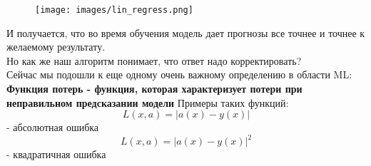 \documentclass[a4paper,12pt]{article} %
\begin{document}
\begin{figure}[htbp]
        \centering
        \texttt{[image: images/lin\_regress.png]}
        \label{fig:example}
    \end{figure}
    И получается, что во время обучения модель дает прогнозы все точнее и точнее к желаемому результату. \\
    \vspace{1cm}
    Но как же наш алгоритм понимает, что ответ надо корректировать?\\
    Сейчас мы подошли к еще одному очень важному определению в области ML: \\
    \vspace{0.8cm}
    \textbf{Функция потерь - функция, которая характеризует потери при неправильном предсказании модели}
    Примеры таких функций:
    \[
        L(x, a) = |a(x) - y(x) |
    \]- абсолютная ошибка
    \[
        L(x, a) = |a(x) - y(x) |^2
    \]- квадратичная ошибка
\end{document}
